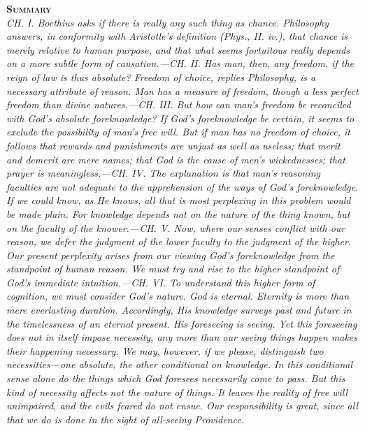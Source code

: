 \documentclass[12pt]{book}
\newenvironment{abstract}%
  {\noindent \textbf{\scshape Summary} \\ \rightskip1in\itshape\small}%
  {\bigskip}
\begin{document}
\begin{abstract}
     CH. I. Boethius asks if there is really any such thing as chance.
     Philosophy answers, in conformity with Aristotle's definition
     (Phys., II. iv.), that chance is merely relative to human purpose,
     and that what seems fortuitous really depends on a more subtle form
     of causation.---CH. II. Has man, then, any freedom, if the reign of
     law is thus absolute? Freedom of choice, replies Philosophy, is a
     necessary attribute of reason. Man has a measure of freedom, though
     a less perfect freedom than divine natures.---CH. III. But how can
     man's freedom be reconciled with God's absolute foreknowledge? If
     God's foreknowledge be certain, it seems to exclude the possibility
     of man's free will. But if man has no freedom of choice, it
     follows that rewards and punishments are unjust as well as useless;
     that merit and demerit are mere names; that God is the cause of
     men's wickednesses; that prayer is meaningless.---CH. IV. The
     explanation is that man's reasoning faculties are not adequate to
     the apprehension of the ways of God's foreknowledge. If we could
     know, as He knows, all that is most perplexing in this problem
     would be made plain. For knowledge depends not on the nature of the
     thing known, but on the faculty of the knower.---CH. V. Now, where
     our senses conflict with our reason, we defer the judgment of the
     lower faculty to the judgment of the higher. Our present perplexity
     arises from our viewing God's foreknowledge from the standpoint of
     human reason. We must try and rise to the higher standpoint of
     God's immediate intuition.---CH. VI. To understand this higher form
     of cognition, we must consider God's nature. God is eternal.
     Eternity is more than mere everlasting duration. Accordingly, His
     knowledge surveys past and future in the timelessness of an eternal
     present. His foreseeing is seeing. Yet this foreseeing does not in
     itself impose necessity, any more than our seeing things happen
     makes their happening necessary. We may, however, if we please,
     distinguish two necessities---one absolute, the other conditional on
     knowledge. In this conditional sense alone do the things which God
     foresees necessarily come to pass. But this kind of necessity
     affects not the nature of things. It leaves the reality of free
     will unimpaired, and the evils feared do not ensue. Our
     responsibility is great, since all that we do is done in the sight
     of all-seeing Providence.
\end{abstract}
\end{document}
